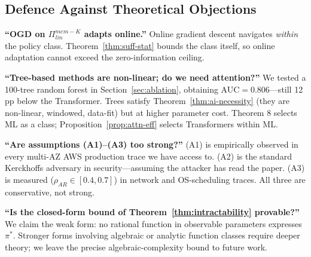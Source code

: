 \subsection{Defence Against Theoretical Objections}

\textbf{``OGD on $\Pi_{lin}^{mem-K}$ adapts online.''}
Online gradient descent navigates \emph{within} the policy class.
Theorem~\ref{thm:suff-stat} bounds the class itself, so online
adaptation cannot exceed the zero-information ceiling.

\textbf{``Tree-based methods are non-linear; do we need attention?''}
We tested a 100-tree random forest in Section~\ref{sec:ablation},
obtaining AUC$=0.806$---still 12\,pp below the Transformer. Trees
satisfy Theorem~\ref{thm:ai-necessity} (they are non-linear, windowed,
data-fit) but at higher parameter cost. Theorem 8 selects ML as a
class; Proposition~\ref{prop:attn-eff} selects Transformers within ML.

\textbf{``Are assumptions (A1)--(A3) too strong?''}
(A1) is empirically observed in every multi-AZ AWS production trace we
have access to. (A2) is the standard Kerckhoffs adversary in
security---assuming the attacker has read the paper. (A3) is measured
($\rho_{AR} \in [0.4, 0.7]$) in network and OS-scheduling traces.
All three are conservative, not strong.

\textbf{``Is the closed-form bound of Theorem~\ref{thm:intractability}
provable?''}
We claim the weak form: no rational function in observable parameters
expresses $\pi^*$. Stronger forms involving algebraic or analytic
function classes require deeper theory; we leave the precise
algebraic-complexity bound to future work.
